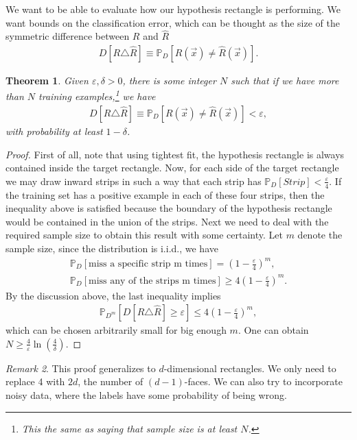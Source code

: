 \documentclass[12pt, letterpaper]{article}
\numberwithin{equation}{section} %
\newcommand{\mb}{\mathbb}
\newcommand{\ve}{\varepsilon}
\newtheorem{theorem}{Theorem}[section]
\theoremstyle{definition}
\theoremstyle{remark}
\newtheorem{remark}[theorem]{Remark}
\begin{document}
We want to be able to evaluate how our hypothesis rectangle is performing. 
We want bounds on the classification error, which can be thought as the size of the symmetric difference between $R$ and $\hat R$
\begin{align}
	D[R\triangle \hat R] \equiv \mb P_D[R(\vec x) \ne \hat R(\vec x)].
\end{align}

\begin{theorem}
	Given $\ve,\delta >0$, there is some integer $N$ such that if we have more than $N$ training examples,\footnote{This the same as saying that sample size is at least $N$.} we have
	\begin{align}
		D[R\triangle \hat R] \equiv \mb P_D[R(\vec x) \ne \hat R(\vec x)] < \ve,
	\end{align}
	with probability at least $1-\delta$.
\end{theorem}

\begin{proof}
	First of all, note that using tightest fit, the hypothesis rectangle is always contained inside the target rectangle. 
	Now, for each side of the target rectangle we may draw inward strips in such a way that each strip has $\mb P_D[Strip] < \frac{\ve}{4}$. 
	If the training set has a positive example in each of these four strips, then the inequality above is satisfied because the boundary of the hypothesis rectangle would be contained in the union of the strips. 
	Next we need to deal with the required sample size to obtain this result with some certainty. 
	Let $m$ denote the sample size, since the distribution is i.i.d., we have
	\begin{align*}
		\mb P_D[\textrm{miss a specific strip m times}] = \left(1-\frac{\ve}{4}\right)^m,\\
		\mb P_D[\textrm{miss any of the strips m times}] \geq 4\left(1-\frac{\ve}{4}\right)^m.
	\end{align*}
	By the discussion above, the last inequality implies
	\begin{align*}
		\mb P_{D^m}[D[R\triangle\hat R]\geq \ve] \leq 4\left(1-\frac{\ve}{4}\right)^m,
	\end{align*}
	which can be chosen arbitrarily small for big enough $m$. 
	One can obtain $N\geq \frac4\ve \ln\left(\frac4\delta\right)$.
\end{proof}

\begin{remark}
	This proof generalizes to $d$-dimensional rectangles. 
	We only need to replace 4 with $2d$, the number of $(d-1)$-faces.
	We can also try to incorporate noisy data, where the labels have some probability of being wrong.
\end{remark}
\end{document}
